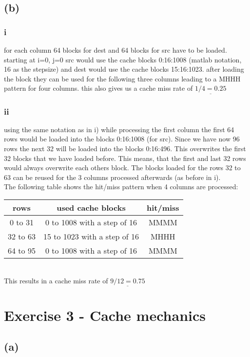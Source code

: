 \documentclass[10pt,a4paper,oneside,notitlepage]{report}
\begin{document}
\subsection*{(b)}
\subsubsection*{i}
for each column 64 blocks for dest and 64 blocks for src have to be loaded. starting at i=0, j=0 src would use the cache blocks 0:16:1008 (matlab notation, 16 as the stepsize) and dest would use the cache blocks 15:16:1023. after loading the block they can be used for the following three columns leading to a MHHH pattern for four columns. this also gives us a cache miss rate of $\underline{1/4=0.25}$

\subsubsection*{ii}
using the same notation as in i) while processing the first column the first 64 rows would be loaded into the blocks 0:16:1008 (for src). Since we have now 96 rows the next 32 will be loaded into the blocks 0:16:496. This overwrites the first 32 blocks that we have loaded before.   This means, that the first and last 32 rows would always overwrite each others block. The blocks loaded for the rows 32 to 63 can be reused for the 3 columns processed afterwards (as before in i). \\
The following table shows the hit/miss pattern when 4 columns are processed:\\
\begin{tabular}{|c|c|c|}
\hline 
\rowcolor{gray!30}
\textbf{rows}  & \textbf{used cache blocks} & \textbf{hit/miss} \\ 
\hline 
0 to 31 & 0 to 1008 with a step of 16 & MMMM \\ 
\hline 
32 to 63 & 15 to 1023 with a step of 16 & MHHH \\ 
\hline 
64 to 95 & 0 to 1008 with a step of 16 & MMMM \\ 
\hline 
\end{tabular}  \\
This results in a cache miss rate of $\underline{9/12=0.75}$

\section*{Exercise 3 - Cache mechanics}
\subsection*{(a)}
\end{document}
